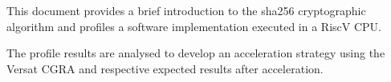 This document provides a brief introduction to the sha256 cryptographic
algorithm and profiles a software implementation executed in a RiscV CPU.

The profile results are analysed to develop an acceleration strategy using the
Versat CGRA and respective expected results after acceleration.
